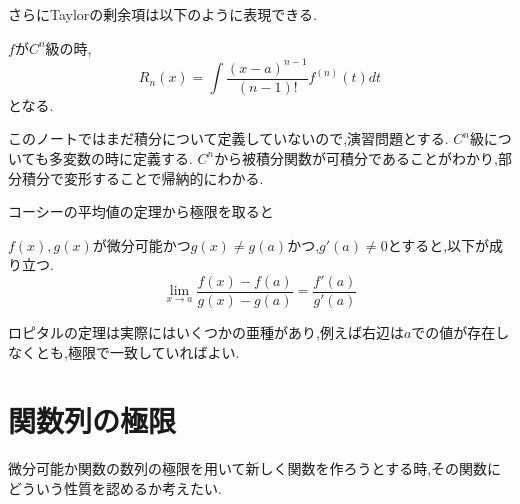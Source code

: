 さらにTaylorの剰余項は以下のように表現できる.
\begin{prop}
$f$が$C^{n}$級の時,
\begin{equation*}
R_n(x) = \int \frac{(x-a)^{n-1}}{(n-1)!}f^{(n)}(t)dt
\end{equation*}
となる.
\end{prop}
このノートではまだ積分について定義していないので,演習問題とする.
$C^n$級についても多変数の時に定義する.
$C^n$から被積分関数が可積分であることがわかり,部分積分で変形することで帰納的にわかる.

コーシーの平均値の定理から極限を取ると
\begin{thm}[ロピタルの定理]
$f(x),g(x)$が微分可能かつ$g(x) \neq g(a)$かつ,$g'(a) \neq 0$とすると,以下が成り立つ.
\begin{equation*}
  \lim_{x \to a}\frac{f(x)-f(a)}{g(x) - g(a)} = \frac{f'(a)}{g'(a)}
\end{equation*}
\end{thm}
\begin{rem}
 ロピタルの定理は実際にはいくつかの亜種があり,例えば右辺は$a$での値が存在しなくとも,極限で一致していればよい.
\end{rem}

\section{関数列の極限}
微分可能か関数の数列の極限を用いて新しく関数を作ろうとする時,その関数にどういう性質を認めるか考えたい.
